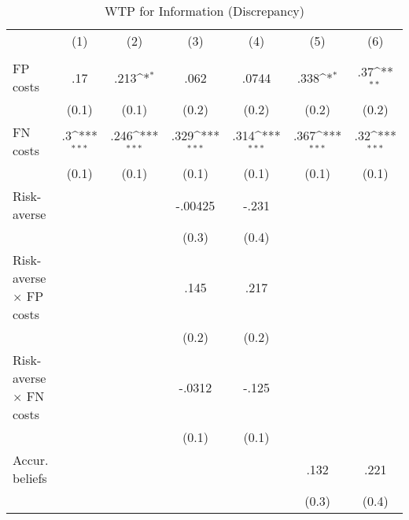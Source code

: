 \begin{table}[htbp]\centering
\def\sym#1{\ifmmode^{#1}\else\(^{#1}\)\fi}
\caption{WTP for Information (Discrepancy)}
\begin{tabular}{l*{6}{c}}
\hline\hline
                &\multicolumn{1}{c}{(1)}&\multicolumn{1}{c}{(2)}&\multicolumn{1}{c}{(3)}&\multicolumn{1}{c}{(4)}&\multicolumn{1}{c}{(5)}&\multicolumn{1}{c}{(6)}\\
                &\multicolumn{1}{c}{}&\multicolumn{1}{c}{}&\multicolumn{1}{c}{}&\multicolumn{1}{c}{}&\multicolumn{1}{c}{}&\multicolumn{1}{c}{}\\
\hline
FP costs        &      .17         &     .213\sym{*}  &     .062         &    .0744         &     .338\sym{*}  &      .37\sym{**} \\
                &    (0.1)         &    (0.1)         &    (0.2)         &    (0.2)         &    (0.2)         &    (0.2)         \\
FN costs        &       .3\sym{***}&     .246\sym{***}&     .329\sym{***}&     .314\sym{***}&     .367\sym{***}&      .32\sym{***}\\
                &    (0.1)         &    (0.1)         &    (0.1)         &    (0.1)         &    (0.1)         &    (0.1)         \\
Risk-averse     &                  &                  &  -.00425         &    -.231         &                  &                  \\
                &                  &                  &    (0.3)         &    (0.4)         &                  &                  \\
Risk-averse $\times$ FP costs&                  &                  &     .145         &     .217         &                  &                  \\
                &                  &                  &    (0.2)         &    (0.2)         &                  &                  \\
Risk-averse $\times$ FN costs&                  &                  &   -.0312         &    -.125         &                  &                  \\
                &                  &                  &    (0.1)         &    (0.1)         &                  &                  \\
Accur. beliefs  &                  &                  &                  &                  &     .132         &     .221         \\
                &                  &                  &                  &                  &    (0.3)         &    (0.4)         \\

\end{tabular}
\end{table}
